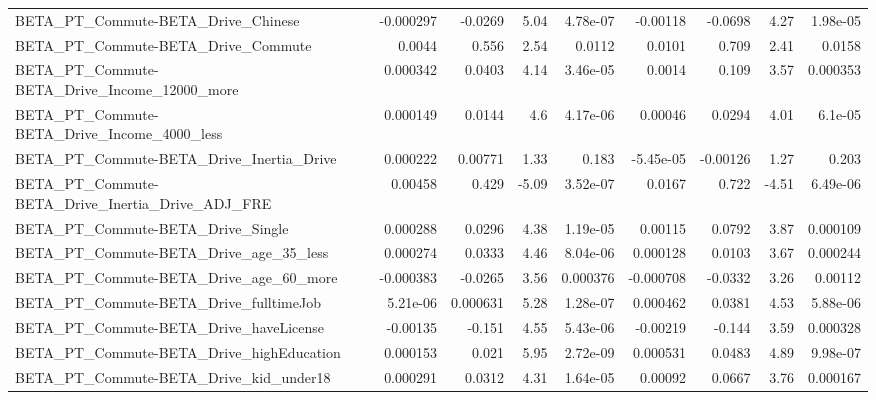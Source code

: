 \begin{tabular}{lrrrrrrrr}
BETA\_PT\_Commute-BETA\_Drive\_Chinese                 &   -0.000297 &      -0.0269 &     5.04 & 4.78e-07 &   -0.00118 &     -0.0698 &         4.27 &      1.98e-05 \\
BETA\_PT\_Commute-BETA\_Drive\_Commute                 &      0.0044 &        0.556 &     2.54 &   0.0112 &     0.0101 &       0.709 &         2.41 &        0.0158 \\
BETA\_PT\_Commute-BETA\_Drive\_Income\_12000\_more       &    0.000342 &       0.0403 &     4.14 & 3.46e-05 &     0.0014 &       0.109 &         3.57 &      0.000353 \\
BETA\_PT\_Commute-BETA\_Drive\_Income\_4000\_less        &    0.000149 &       0.0144 &      4.6 & 4.17e-06 &    0.00046 &      0.0294 &         4.01 &       6.1e-05 \\
BETA\_PT\_Commute-BETA\_Drive\_Inertia\_Drive           &    0.000222 &      0.00771 &     1.33 &    0.183 &  -5.45e-05 &    -0.00126 &         1.27 &         0.203 \\
BETA\_PT\_Commute-BETA\_Drive\_Inertia\_Drive\_ADJ\_FRE   &     0.00458 &        0.429 &    -5.09 & 3.52e-07 &     0.0167 &       0.722 &        -4.51 &      6.49e-06 \\
BETA\_PT\_Commute-BETA\_Drive\_Single                  &    0.000288 &       0.0296 &     4.38 & 1.19e-05 &    0.00115 &      0.0792 &         3.87 &      0.000109 \\
BETA\_PT\_Commute-BETA\_Drive\_age\_35\_less             &    0.000274 &       0.0333 &     4.46 & 8.04e-06 &   0.000128 &      0.0103 &         3.67 &      0.000244 \\
BETA\_PT\_Commute-BETA\_Drive\_age\_60\_more             &   -0.000383 &      -0.0265 &     3.56 & 0.000376 &  -0.000708 &     -0.0332 &         3.26 &       0.00112 \\
BETA\_PT\_Commute-BETA\_Drive\_fulltimeJob             &    5.21e-06 &     0.000631 &     5.28 & 1.28e-07 &   0.000462 &      0.0381 &         4.53 &      5.88e-06 \\
BETA\_PT\_Commute-BETA\_Drive\_haveLicense             &    -0.00135 &       -0.151 &     4.55 & 5.43e-06 &   -0.00219 &      -0.144 &         3.59 &      0.000328 \\
BETA\_PT\_Commute-BETA\_Drive\_highEducation           &    0.000153 &        0.021 &     5.95 & 2.72e-09 &   0.000531 &      0.0483 &         4.89 &      9.98e-07 \\
BETA\_PT\_Commute-BETA\_Drive\_kid\_under18             &    0.000291 &       0.0312 &     4.31 & 1.64e-05 &    0.00092 &      0.0667 &         3.76 &      0.000167 \\

\end{tabular}
